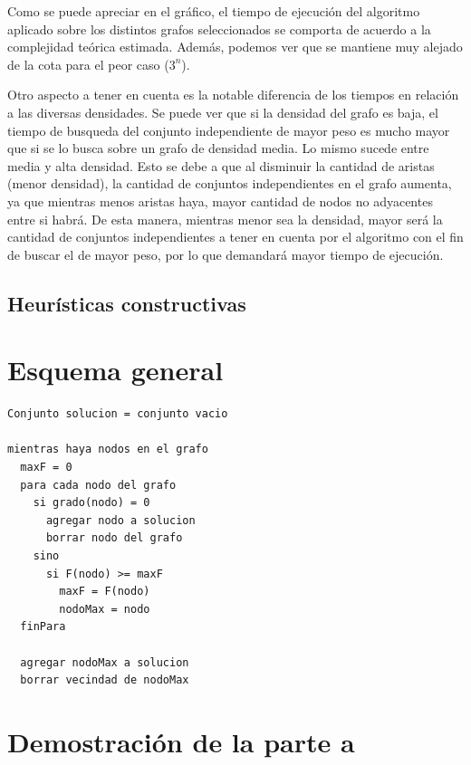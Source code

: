 \documentclass[a4paper,11pt] {article}
\begin{document}
Como se puede apreciar en el gr\'afico, el tiempo de ejecuci\'on del algoritmo aplicado sobre los distintos grafos seleccionados se comporta de acuerdo a la complejidad te\'orica estimada. Adem\'as, podemos ver que se mantiene muy alejado de la cota para el peor caso ($3^{n}$).

Otro aspecto a tener en cuenta es la notable diferencia de los tiempos en relaci\'on a las diversas densidades. Se puede ver que si la densidad del grafo es baja, el tiempo de busqueda del conjunto independiente de mayor peso es mucho mayor que si se lo busca sobre un grafo de densidad media. Lo mismo sucede entre media y alta densidad. Esto se debe a que al disminuir la cantidad de aristas (menor densidad), la cantidad de conjuntos independientes en el grafo aumenta, ya que mientras menos aristas haya, mayor cantidad de nodos no adyacentes entre si habr\'a. De esta manera, mientras menor sea la densidad, mayor ser\'a la cantidad de conjuntos independientes a tener en cuenta por el algoritmo con el fin de buscar el de mayor peso, por lo que demandar\'a mayor tiempo de ejecuci\'on.

\bigskip

\begin{center}
\section*{Heur\'isticas constructivas}
\end{center}

\bigskip
\section*{Esquema general}

\begin{verbatim}
Conjunto solucion = conjunto vacio

mientras haya nodos en el grafo
  maxF = 0
  para cada nodo del grafo
    si grado(nodo) = 0
      agregar nodo a solucion
      borrar nodo del grafo
    sino
      si F(nodo) >= maxF
        maxF = F(nodo)
        nodoMax = nodo
  finPara

  agregar nodoMax a solucion
  borrar vecindad de nodoMax
\end{verbatim}



\section*{Demostraci\'on de la parte a}
\end{document}

